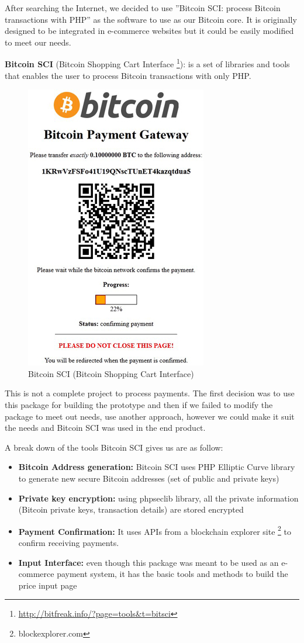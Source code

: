 After searching the Internet, we decided to use ''Bitcoin SCI: process Bitcoin transactions with PHP'' as the software to use as our Bitcoin core. It is originally designed to be integrated in e-commerce websites but it could be easily modified to meet our needs. 


\textbf{Bitcoin SCI } (Bitcoin Shopping Cart Interface \footnote{\url{http://bitfreak.info/?page=tools&t=bitsci}}): is a set of libraries and tools that enables the user to process Bitcoin transactions with only PHP. 

\begin{figure}[htb!p]
\centering
\includegraphics[scale=0.5]{fig/bitsci_screen.jpg}
  \caption{Bitcoin SCI (Bitcoin Shopping Cart Interface)}
\label{fig:Bitcoin-sci}
\end{figure}


This is not a complete project to process payments. The first decision was to use this package for building the prototype and then if we failed to modify the package to meet out needs, use another approach, however we could make it suit the needs and Bitcoin SCI was used in the end product. 

A break down of the tools Bitcoin SCI gives us are as follow:
\begin{itemize}
\item \textbf{Bitcoin Address generation: } Bitcoin SCI uses PHP Elliptic Curve library to generate new secure Bitcoin addresses (set of public and private keys)
\item \textbf{Private key encryption: } using phpseclib library, all the private information (Bitcoin private keys, transaction details) are stored encrypted
\item \textbf{Payment Confirmation: } It uses APIs from a blockchain explorer site \footnote{blockexplorer.com} to confirm receiving payments.
\item \textbf{Input Interface: } even though this package was meant to be used as an e-commerce payment system, it has the basic tools and methods to build the price input page
\end{itemize}

